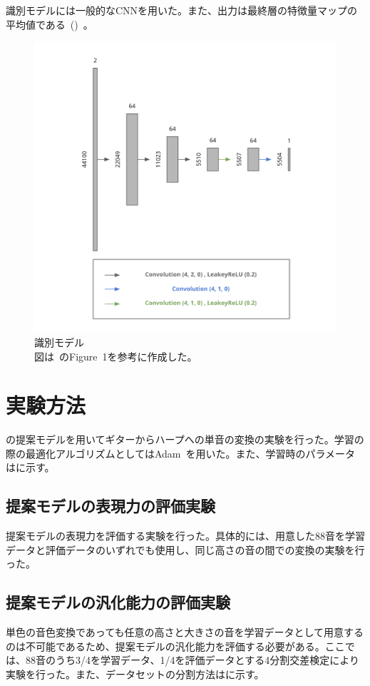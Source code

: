 識別モデルには一般的なCNNを用いた。また、出力は最終層の特徴量マップの平均値である~()~。

\begin{figure}[b]
\centering
\includegraphics[width=0.6\columnwidth]{figure/pr_discriminator.png}
\caption[本研究の識別モデル]{識別モデル\\
図は~\cite{u-net}のFigure~1を参考に作成した。}
\label{fig:pr_dis}
\end{figure}

\section{実験方法}

の提案モデルを用いてギターからハープへの単音の変換の実験を行った。学習の際の最適化アルゴリズムとしてはAdam~\cite{Adam}を用いた。また、学習時のパラメータはに示す。

\subsection{提案モデルの表現力の評価実験}

提案モデルの表現力を評価する実験を行った。具体的には、用意した88音を学習データと評価データのいずれでも使用し、同じ高さの音の間での変換の実験を行った。

\subsection{提案モデルの汎化能力の評価実験}

単色の音色変換であっても任意の高さと大きさの音を学習データとして用意するのは不可能であるため、提案モデルの汎化能力を評価する必要がある。ここでは、88音のうち3/4を学習データ、1/4を評価データとする4分割交差検定により実験を行った。また、データセットの分割方法はに示す。

